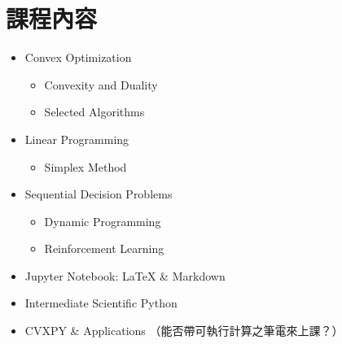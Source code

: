 \documentclass[11pt]{extarticle}
\begin{document}
\section*{課程內容}

\begin{itemize}[itemsep=0mm]
  \item Convex Optimization
    \vspace{-2mm}
    \begin{itemize}
      \item Convexity and Duality
      \item Selected Algorithms
    \end{itemize}
  \item Linear Programming
    \vspace{-2mm}
    \begin{itemize}
      \item Simplex Method
    \end{itemize}
  \item Sequential Decision Problems
    \vspace{-2mm}
    \begin{itemize}
      \item Dynamic Programming 
      \item Reinforcement Learning 
    \end{itemize}
  \item Jupyter Notebook: \LaTeX{} \& Markdown 
  \item Intermediate Scientific Python
  \item CVXPY \& Applications （能否帶可執行計算之筆電來上課？）
\end{itemize}

\newpage
\end{document}
